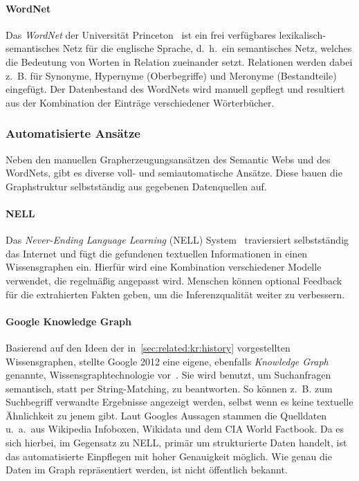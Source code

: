 \paragraph{WordNet}
Das \textit{WordNet} der Universität Princeton~\cite{WordNet} ist ein frei verfügbares lexikalisch-semantisches Netz für die englische Sprache, d.~h.\ ein semantisches Netz, welches die Bedeutung von Worten in Relation zueinander setzt.
Relationen werden dabei z.~B. für Synonyme, Hypernyme (Oberbegriffe) und Meronyme (Bestandteile) eingefügt.
Der Datenbestand des WordNets wird manuell gepflegt und resultiert aus der Kombination der Einträge verschiedener Wörterbücher.

\subsubsection{Automatisierte Ansätze}
Neben den manuellen Grapherzeugungsansätzen des Semantic Webs und des WordNets, gibt es diverse voll- und semiautomatische Ansätze.
Diese bauen die Graphstruktur selbstständig aus gegebenen Datenquellen auf.

\paragraph{NELL}
Das \textit{Never-Ending Language Learning} (NELL) System~\cite{Carlson2010} traviersiert selbstständig das Internet und fügt die gefundenen textuellen Informationen in einen Wissensgraphen ein.
Hierfür wird eine Kombination verschiedener Modelle verwendet, die regelmäßig angepasst wird.
Menschen können optional Feedback für die extrahierten Fakten geben, um die Inferenzqualität weiter zu verbessern.

\paragraph{Google Knowledge Graph}
Basierend auf den Ideen der in~\ref{sec:related:kr:history} vorgestellten Wissensgraphen, stellte Google 2012 eine eigene, ebenfalls \textit{Knowledge Graph} genannte, Wissensgraphtechnologie vor~\cite{Singhal2012}.
Sie wird benutzt, um Suchanfragen semantisch, statt per String-Matching, zu beantworten.
So können z.~B. zum Suchbegriff verwandte Ergebnisse angezeigt werden, selbst wenn es keine textuelle Ähnlichkeit zu jenem gibt.
Laut Googles Aussagen stammen die Quelldaten u.~a.\ aus Wikipedia Infoboxen, Wikidata und dem CIA World Factbook.
Da es sich hierbei, im Gegensatz zu NELL, primär um strukturierte Daten handelt, ist das automatisierte Einpflegen mit hoher Genauigkeit möglich.
Wie genau die Daten im Graph repräsentiert werden, ist nicht öffentlich bekannt.

